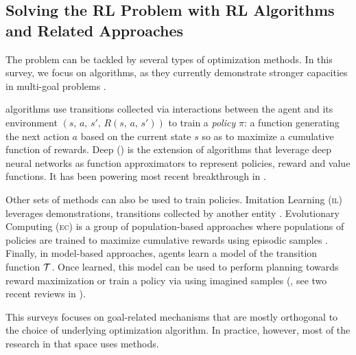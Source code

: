 \subsection{Solving the RL Problem with RL Algorithms and Related Approaches}
The \rl problem can be tackled by several types of optimization methods. In this survey, we focus on \rl
algorithms, as they currently demonstrate stronger capacities in multi-goal problems \cite{goalgan,eysenbach2018diversity,warde2018unsupervised,pong2019skew,lynch2020grounding,hill_human_2020,hill_grounded_2020,abramson_imitating_2020,imagine,team2021open}.

\rl algorithms use transitions collected via interactions between the agent and its environment $(s,\,a,\,s',\,R(s,\,a,\,s'))$ to train a \textit{policy} $\pi$: a function generating the next action $a$ based on the current state $s$ so as to maximize a cumulative function of rewards. Deep \rl  (\drl) is the extension of \rl algorithms that leverage deep neural networks as function approximators to represent policies, reward and value functions. It has been powering most recent breakthrough in \rl  \cite{eysenbach2018diversity,warde2018unsupervised,goalgan,pong2019skew,lynch2020grounding,hill_human_2020,hill_grounded_2020,abramson_imitating_2020,imagine,team2021open}.

Other sets of methods can also be used to train policies. Imitation Learning (\textsc{il}) leverages demonstrations, \ie transitions collected by another entity \cite{ho2016generative,hester2018deep}. Evolutionary Computing (\textsc{ec}) is a group of population-based approaches where populations of policies are trained to maximize cumulative rewards using episodic samples \cite{sehnke2010parameter,lehman2011evolving,wierstra2014natural,mouret2015illuminating,salimans2017evolution,imgep,colas2020scaling}. Finally, in model-based \rl approaches, agents learn a model of the transition function $\mathcal{T}$. Once learned, this model can be used to perform planning towards reward maximization or train a policy via \rl using imagined samples (\eg \cite{schmidhuber_making_1990,dayan_helmholtz_1995,nguyen-tuong_model_2011,chua2018deep,charlesworth2020plangan,schrittwieser_mastering_2020}, see two recent reviews in \cite{hamrick_role_2020,moerland_intersection_2021}).

This surveys focuses on goal-related mechanisms that are mostly orthogonal to the choice of underlying
optimization algorithm. In practice, however, most of the research in that space uses \drl methods.

